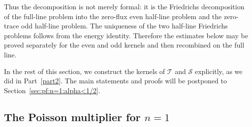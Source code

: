 \documentclass[12pt]{amsart}
\begin{document}
Thus the decomposition is not merely formal: it is the Friedrichs decomposition of
the full-line problem into the zero-flux even half-line problem and the zero-trace
odd half-line problem. The uniqueness of the two half-line Friedrichs problems
follows from the energy identity. Therefore the estimates below may be proved
separately for the even and odd kernels and then recombined on the full line.

In the rest of this section, we construct the kernels of $\mathcal{T}$ and $\mathcal{S}$ explicitly, as we did in Part~\ref{part2}. The main statements and proofs will be postponed to Section~\ref{sec:pf:n=1:alpha<1/2}.






\subsection{The Poisson multiplier for \texorpdfstring{$n=1$}{n=1}}
\end{document}
